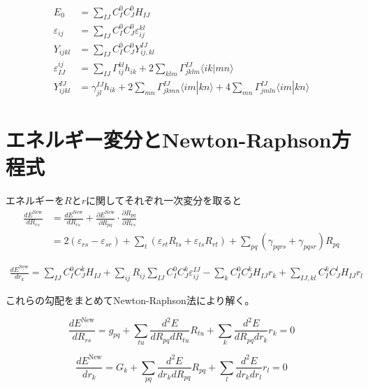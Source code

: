 \documentclass{article}
\begin{document}
\begin{align}
E_0 &= \sum_{IJ} C_I^0 C_J^0 H_{IJ}\\
\varepsilon_{ij} &= \sum_{IJ} C_I^0 C_J^0 \varepsilon_{ij}^{kl}\\
Y_{ijkl} &= \sum_{IJ} C_I^0 C_J^0 Y_{ij,kl}^{IJ}\\
\varepsilon_{IJ}^{ij} &= \sum_{IJ} \Gamma_{ij}^{kl} h_{ik} + 2 \sum_{klm} \Gamma_{jklm}^{IJ} \langle ik | mn \rangle\\
Y_{ijkl}^{IJ} &= \gamma_{jl}^{IJ} h_{ik} + 2 \sum_{mn} \Gamma_{jkmn}^{IJ} \langle im | kn \rangle + 4 \sum_{mn} \Gamma^{IJ}_{jmln} \langle im | kn \rangle
\label{}
\end{align}

\section*{エネルギー変分とNewton-Raphson方程式}
エネルギーを\(R\)と\(r\)に関してそれぞれ一次変分を取ると
\begin{equation}
\begin{split}
\frac{d E^{\text{New}}}{d R_{rs}} &= \frac{d E^{\text{New}}}{d R_{rs}} + \frac{\partial E^{\text{New}}}{\partial R_{pq}} \cdot \frac{\partial R_{pq}}{\partial R_{rs}} \\
&= 2(\varepsilon_{rs} - \varepsilon_{sr}) + \sum_t \left( \varepsilon_{rt} R_{ts} + \varepsilon_{ts} R_{rt} \right) + \sum_{pq} (\gamma_{pqrs} + \gamma_{pqsr}) R_{pq}
\label{eq:64}
\end{split}
\end{equation}

\begin{equation}
\begin{split}
\frac{d E^{\text{New}}}{d r_k} 
= \sum_{IJ} C_I^0 C_J^k H_{IJ} + \sum_{ij} R_{ij} \sum_{IJ} C_I^0 C_J^k \varepsilon_{ij}^{IJ} 
- \sum_k C_I^0 C_J^k H_{IJ} r_k + \sum_{IJ,kl} C_I^k C_J^l H_{IJ} r_l
\label{eq:65}
\end{split}
\end{equation}

\noindent
これらの勾配をまとめてNewton-Raphson法により解く。

\begin{equation}
\frac{d E^{\text{New}}}{d R_{rs}} = g_{pq} + \sum_{tu} \frac{d^2 E}{d R_{pq} d R_{tu}} R_{tu} + \sum_k \frac{d^2 E}{d R_{pq} d r_k} r_k = 0
\label{eq:66}
\end{equation}

\begin{equation}
\frac{d E^{\text{New}}}{d r_k} = G_k + \sum_{pq} \frac{d^2 E}{d r_k d R_{pq}} R_{pq} + \sum_l \frac{d^2 E}{d r_k d r_l} r_l = 0
\label{eq:67}
\end{equation}
\end{document}
